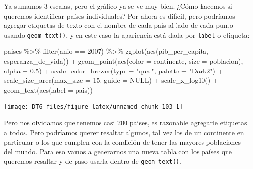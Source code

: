 \documentclass[
  openany]{book}
\newenvironment{Shaded}{\begin{snugshade}}{\end{snugshade}}
\newcommand{\AttributeTok}[1]{\textcolor[rgb]{0.77,0.63,0.00}{#1}}
\newcommand{\ConstantTok}[1]{\textcolor[rgb]{0.00,0.00,0.00}{#1}}
\newcommand{\DecValTok}[1]{\textcolor[rgb]{0.00,0.00,0.81}{#1}}
\newcommand{\FloatTok}[1]{\textcolor[rgb]{0.00,0.00,0.81}{#1}}
\newcommand{\FunctionTok}[1]{\textcolor[rgb]{0.00,0.00,0.00}{#1}}
\newcommand{\NormalTok}[1]{#1}
\newcommand{\SpecialCharTok}[1]{\textcolor[rgb]{0.00,0.00,0.00}{#1}}
\newcommand{\StringTok}[1]{\textcolor[rgb]{0.31,0.60,0.02}{#1}}
\begin{document}
Ya sumamos 3 escalas, pero el gráfico ya se ve muy bien.
¿Cómo hacemos si queremos identificar países individuales?
Por ahora es difícil, pero podríamos agregar etiquetas de texto con el nombre de cada país al lado de cada punto usando \texttt{geom\_text()}, y en este caso la apariencia está dada por \texttt{label} o etiqueta:

\begin{Shaded}
\begin{Highlighting}[]
\NormalTok{paises }\SpecialCharTok{\%\textgreater{}\%} 
  \FunctionTok{filter}\NormalTok{(anio }\SpecialCharTok{==} \DecValTok{2007}\NormalTok{) }\SpecialCharTok{\%\textgreater{}\%} 
  \FunctionTok{ggplot}\NormalTok{(}\FunctionTok{aes}\NormalTok{(pib\_per\_capita, esperanza\_de\_vida)) }\SpecialCharTok{+}
  \FunctionTok{geom\_point}\NormalTok{(}\FunctionTok{aes}\NormalTok{(}\AttributeTok{color =}\NormalTok{ continente, }\AttributeTok{size =}\NormalTok{ poblacion), }\AttributeTok{alpha =} \FloatTok{0.5}\NormalTok{) }\SpecialCharTok{+}
  \FunctionTok{scale\_color\_brewer}\NormalTok{(}\AttributeTok{type =} \StringTok{"qual"}\NormalTok{, }\AttributeTok{palette =} \StringTok{"Dark2"}\NormalTok{) }\SpecialCharTok{+}
  \FunctionTok{scale\_size\_area}\NormalTok{(}\AttributeTok{max\_size =} \DecValTok{15}\NormalTok{, }\AttributeTok{guide =} \ConstantTok{NULL}\NormalTok{) }\SpecialCharTok{+}
  \FunctionTok{scale\_x\_log10}\NormalTok{() }\SpecialCharTok{+}
  \FunctionTok{geom\_text}\NormalTok{(}\FunctionTok{aes}\NormalTok{(}\AttributeTok{label =}\NormalTok{ pais)) }
\end{Highlighting}
\end{Shaded}

\begin{center}\texttt{[image: DT6\_files/figure-latex/unnamed-chunk-103-1]} \end{center}

Pero nos olvidamos que tenemos casi 200 países, es razonable agregarle etiquetas a todos.
Pero podríamos querer resaltar algunos, tal vez los de un continente en particular o los que cumplen con la condición de tener las mayores poblaciones del mundo.
Para eso vamos a generarnos una nueva tabla con los países que queremos resaltar y de paso usarla dentro de \texttt{geom\_text()}.
\end{document}
